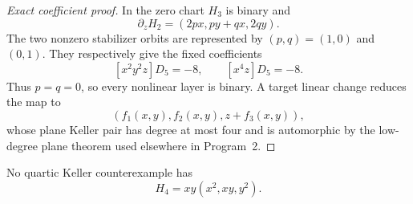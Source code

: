 \begin{proof}[Exact coefficient proof]
In the zero chart \(H_3\) is binary and
\[
 \partial_zH_2=(2px,py+qx,2qy).
\]
The two nonzero stabilizer orbits are represented by \((p,q)=(1,0)\) and
\((0,1)\).  They respectively give the fixed coefficients
\[
 [x^2y^2z]D_5=-8,
 \qquad
 [x^4z]D_5=-8.
\]
Thus \(p=q=0\), so every nonlinear layer is binary.  A target linear change
reduces the map to
\[
 (f_1(x,y),f_2(x,y),z+f_3(x,y)),
\]
whose plane Keller pair has degree at most four and is automorphic by the
low-degree plane theorem used elsewhere in Program~2.
\end{proof}

\begin{theorem}
\label{thm:quartic-conic-xy}
No quartic Keller counterexample has
\[
 H_4=xy(x^2,xy,y^2).
\]
\end{theorem}

